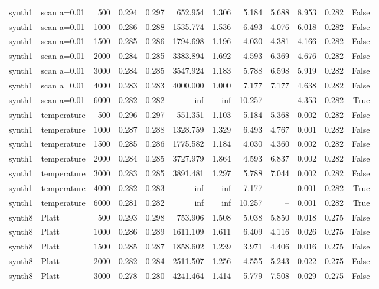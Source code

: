 \begin{tabular}{llrrrrrrrrrr}
synth1 & scan a=0.01 & 500 & 0.294 & 0.297 & 652.954 & 1.306 & 5.184 & 5.688 & 8.953 & 0.282 & False \\
synth1 & scan a=0.01 & 1000 & 0.286 & 0.288 & 1535.774 & 1.536 & 6.493 & 4.076 & 6.018 & 0.282 & False \\
synth1 & scan a=0.01 & 1500 & 0.285 & 0.286 & 1794.698 & 1.196 & 4.030 & 4.381 & 4.166 & 0.282 & False \\
synth1 & scan a=0.01 & 2000 & 0.284 & 0.285 & 3383.894 & 1.692 & 4.593 & 6.369 & 4.676 & 0.282 & False \\
synth1 & scan a=0.01 & 3000 & 0.284 & 0.285 & 3547.924 & 1.183 & 5.788 & 6.598 & 5.919 & 0.282 & False \\
synth1 & scan a=0.01 & 4000 & 0.283 & 0.283 & 4000.000 & 1.000 & 7.177 & 7.177 & 4.638 & 0.282 & False \\
synth1 & scan a=0.01 & 6000 & 0.282 & 0.282 & inf & inf & 10.257 & -- & 4.353 & 0.282 & True \\
synth1 & temperature & 500 & 0.296 & 0.297 & 551.351 & 1.103 & 5.184 & 5.368 & 0.002 & 0.282 & False \\
synth1 & temperature & 1000 & 0.287 & 0.288 & 1328.759 & 1.329 & 6.493 & 4.767 & 0.001 & 0.282 & False \\
synth1 & temperature & 1500 & 0.285 & 0.286 & 1775.582 & 1.184 & 4.030 & 4.360 & 0.002 & 0.282 & False \\
synth1 & temperature & 2000 & 0.284 & 0.285 & 3727.979 & 1.864 & 4.593 & 6.837 & 0.002 & 0.282 & False \\
synth1 & temperature & 3000 & 0.283 & 0.285 & 3891.481 & 1.297 & 5.788 & 7.044 & 0.002 & 0.282 & False \\
synth1 & temperature & 4000 & 0.282 & 0.283 & inf & inf & 7.177 & -- & 0.001 & 0.282 & True \\
synth1 & temperature & 6000 & 0.281 & 0.282 & inf & inf & 10.257 & -- & 0.001 & 0.282 & True \\
synth8 & Platt & 500 & 0.293 & 0.298 & 753.906 & 1.508 & 5.038 & 5.850 & 0.018 & 0.275 & False \\
synth8 & Platt & 1000 & 0.286 & 0.289 & 1611.109 & 1.611 & 6.409 & 4.116 & 0.026 & 0.275 & False \\
synth8 & Platt & 1500 & 0.285 & 0.287 & 1858.602 & 1.239 & 3.971 & 4.406 & 0.016 & 0.275 & False \\
synth8 & Platt & 2000 & 0.282 & 0.284 & 2511.507 & 1.256 & 4.555 & 5.243 & 0.022 & 0.275 & False \\
synth8 & Platt & 3000 & 0.278 & 0.280 & 4241.464 & 1.414 & 5.779 & 7.508 & 0.029 & 0.275 & False \\

\end{tabular}
